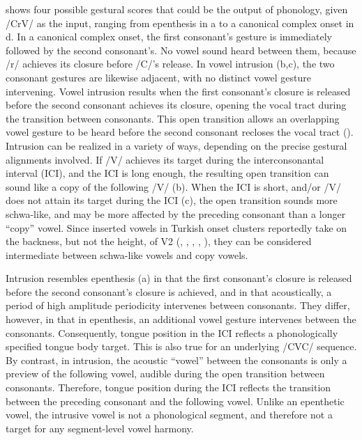 \documentclass[output=paper,colorlinks,citecolor=brown]{langscibook}
\begin{document}
 shows four possible gestural scores that could be the output of phonology, given /CrV/ as the input, ranging from epenthesis in a to a canonical complex onset in d. In a canonical complex onset, the first consonant's gesture is immediately followed by the second consonant's. No vowel sound heard between them, because /r/ achieves its closure before /C/'s release. In vowel intrusion (b,c), the two consonant gestures are likewise adjacent, with no distinct vowel gesture intervening. Vowel intrusion results when the first consonant's closure is released before the second consonant achieves its closure, opening the vocal tract during the transition between consonants. This open transition allows an overlapping vowel gesture to be heard before the second consonant recloses the vocal tract (\cite{BrowmanGoldstein1993, Gafos2002, Hall:2003, Hall2006}). Intrusion can be realized in a variety of ways, depending on the precise gestural alignments involved. If /V/ achieves its target during the interconsonantal interval (ICI), and the ICI is long enough, the resulting open transition can sound like a copy of the following /V/ (b). When the ICI is short, and/or /V/ does not attain its target during the ICI (c), the open transition sounds more schwa-like, and may be more affected by the preceding consonant than a longer “copy” vowel. Since inserted vowels in Turkish onset clusters reportedly take on the backness, but not the height, of V2 (\citealt{Yavas1980}, \citealt{ClementsSezer:1982}, \citealt{Kaun1999}, \cite{Yildiz2010}, \citealt{Kabak2011}), they can be considered intermediate between schwa-like vowels and copy vowels.

Intrusion resembles epenthesis (a) in that the first consonant's closure is released before the second consonant's closure is achieved, and in that acoustically, a period of high amplitude periodicity intervenes between consonants. They differ, however, in that in epenthesis, an additional vowel gesture intervenes between the consonants. Consequently, tongue position in the ICI reflects a phonologically specified tongue body target. This is also true for an underlying /CVC/ sequence. By contrast, in intrusion, the acoustic “vowel” between the consonants is only a preview of the following vowel, audible during the open transition between consonants. Therefore, tongue position during the ICI reflects the transition between the preceding consonant and the following vowel. Unlike an epenthetic vowel, the intrusive vowel is not a phonological segment, and therefore not a target for any segment-level vowel harmony.
\end{document}
